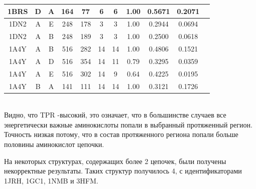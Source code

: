 \begin{table}
\begin{center}
{\begin{tabular}{|c|c|c|c|c|c|c|c|c|c|c|}
1BRS & D & A & 164 & 77 & 6 & 6 & 1.00 & 0.5671 & 0.2071\\
\hline
1DN2 & A & E & 248 & 178 & 3 & 3 & 1.00 & 0.2944 & 0.0694\\
1DN2 & A & B & 248 & 189 & 3 & 3 & 1.00 & 0.2500 & 0.0618\\
\hline
1A4Y & A & B & 516 & 282 & 14 & 14 & 1.00	& 0.4806 & 0.1521\\
1A4Y & A & D & 516 & 354 & 14 & 11 & 0.79 & 0.3295 & 0.0359\\
1A4Y & A & E & 516 & 302 & 14 & 9 & 0.64 & 0.4225 & 0.0195\\
1A4Y & B & A & 141 & 111 & 14 & 14 & 1.00 & 0.3121 & 0.1726\\
\hline
\end{tabular}
}
\end{center}
\end{table}
\\[10pt]

Видно, что TPR -высокий, это означает, что в большинстве случаев все энергетически важные аминокислоты попали в выбранный протяженный регион. Точность низкая потому, что в состав протяженного региона попали больше половины аминокислот цепочки.

На некоторых структурах, содержащих более 2 цепочек, были получены некорректные результаты. Таких структур получилось 4, с идентификаторами 1JRH, 1GC1, 1NMB и 3HFM. %
